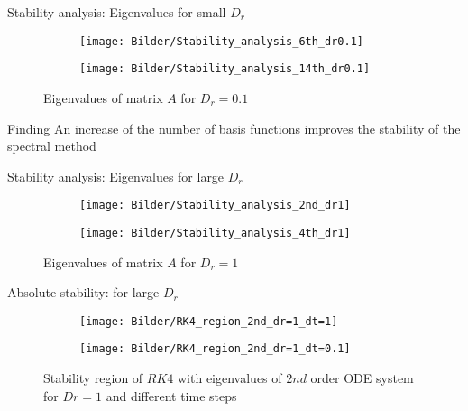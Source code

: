 \begin{frame}{Stability analysis: Eigenvalues for small $D_r$}
	\begin{figure}
		\begin{subfigure}{0.48\textwidth}
			\texttt{[image: Bilder/Stability\_analysis\_6th\_dr0.1]}
		\end{subfigure}
		\hfill
		\begin{subfigure}{0.48\textwidth}
			\texttt{[image: Bilder/Stability\_analysis\_14th\_dr0.1]}
		\end{subfigure}
		\caption{Eigenvalues of matrix $A$ for $D_r = 0.1$}
	\end{figure}
	\begin{block}{Finding}
		An increase of the number of basis functions improves the stability of the spectral method
	\end{block}
\end{frame}

\begin{frame}{Stability analysis: Eigenvalues for large $D_r$}
	\begin{figure}
		\begin{subfigure}{0.48\textwidth}
			\texttt{[image: Bilder/Stability\_analysis\_2nd\_dr1]}
		\end{subfigure}
		\hfill
		\begin{subfigure}{0.48\textwidth}
			\texttt{[image: Bilder/Stability\_analysis\_4th\_dr1]}
		\end{subfigure}
		\caption{Eigenvalues of matrix $A$ for $D_r = 1$}
	\end{figure}
\end{frame}

\begin{frame}{Absolute stability: for large $D_r$}
	\begin{figure}
		\begin{subfigure}{0.48\textwidth}
			\texttt{[image: Bilder/RK4\_region\_2nd\_dr=1\_dt=1]}
		\end{subfigure}
		\hfill
		\begin{subfigure}{0.48\textwidth}
			\texttt{[image: Bilder/RK4\_region\_2nd\_dr=1\_dt=0.1]}
		\end{subfigure}
		\caption{Stability region of $RK4$ with eigenvalues of $2nd$ order ODE system for $Dr=1$ and different time steps}
	\end{figure}
\end{frame}

